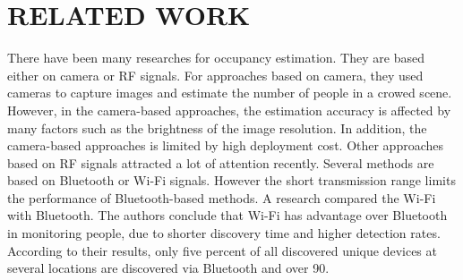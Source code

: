 \chapter{RELATED WORK}
There have been many researches for occupancy estimation. They are based either on camera or RF signals.
For approaches based on camera, they used cameras to capture images and estimate the number of people in a crowed scene\cite{Ma_2013_CVPR}. However, in the camera-based approaches, the estimation accuracy is affected by many factors such as the brightness of the image resolution. In addition, the camera-based approaches is limited by high deployment cost.
Other approaches based on RF signals attracted a lot of attention recently. Several methods are based on Bluetooth or Wi-Fi signals. However the short transmission range limits the performance of Bluetooth-based methods. A research compared the Wi-Fi with Bluetooth. The authors conclude that Wi-Fi has advantage over Bluetooth in monitoring people, due to shorter discovery time and higher detection rates\cite{quteprints71808}. According to their results, only
five percent of all discovered unique devices at several locations are discovered via Bluetooth and over 90.
